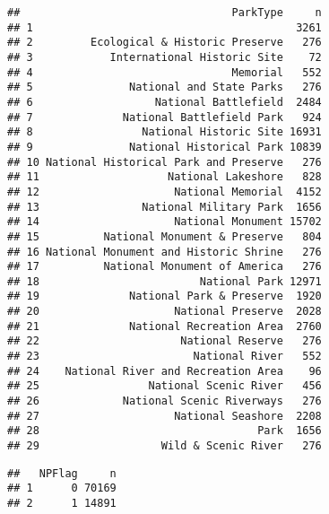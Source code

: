 \documentclass[
]{article}
\newenvironment{Shaded}{\begin{snugshade}}{\end{snugshade}}
\newcommand{\KeywordTok}[1]{\textcolor[rgb]{0.13,0.29,0.53}{\textbf{#1}}}
\newcommand{\NormalTok}[1]{#1}
\newcommand{\OperatorTok}[1]{\textcolor[rgb]{0.81,0.36,0.00}{\textbf{#1}}}
\newcommand{\StringTok}[1]{\textcolor[rgb]{0.31,0.60,0.02}{#1}}
\begin{document}
\begin{Shaded}
\end{Shaded}

\begin{verbatim}
##                                 ParkType     n
## 1                                         3261
## 2         Ecological & Historic Preserve   276
## 3            International Historic Site    72
## 4                               Memorial   552
## 5               National and State Parks   276
## 6                   National Battlefield  2484
## 7              National Battlefield Park   924
## 8                 National Historic Site 16931
## 9               National Historical Park 10839
## 10 National Historical Park and Preserve   276
## 11                    National Lakeshore   828
## 12                     National Memorial  4152
## 13                National Military Park  1656
## 14                     National Monument 15702
## 15          National Monument & Preserve   804
## 16 National Monument and Historic Shrine   276
## 17          National Monument of America   276
## 18                         National Park 12971
## 19              National Park & Preserve  1920
## 20                     National Preserve  2028
## 21              National Recreation Area  2760
## 22                      National Reserve   276
## 23                        National River   552
## 24    National River and Recreation Area    96
## 25                 National Scenic River   456
## 26             National Scenic Riverways   276
## 27                     National Seashore  2208
## 28                                  Park  1656
## 29                   Wild & Scenic River   276
\end{verbatim}

\begin{Shaded}
\end{Shaded}

\begin{verbatim}
##   NPFlag     n
## 1      0 70169
## 2      1 14891
\end{verbatim}

\begin{Shaded}
\end{Shaded}
\end{document}
